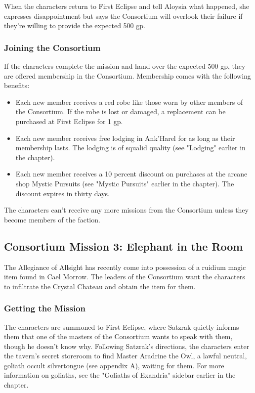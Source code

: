 \documentclass[10pt,a4paper,twoside,twocolumn,openany,nodeprecatedcode]{dndbook}
\begin{document}
When the characters return to First Eclipse and tell Aloysia what happened, she expresses disappointment but says the Consortium will overlook their failure if they're willing to provide the expected 500 gp.

\subsubsection{Joining the Consortium}
If the characters complete the mission and hand over the expected 500 gp, they are offered membership in the Consortium. Membership comes with the following benefits:


\begin{itemize}
\item Each new member receives a red robe like those worn by other members of the Consortium. If the robe is lost or damaged, a replacement can be purchased at First Eclipse for 1 gp.
\item Each new member receives free lodging in Ank'Harel for as long as their membership lasts. The lodging is of squalid quality (see "Lodging" earlier in the chapter).
\item Each new member receives a 10 percent discount on purchases at the arcane shop Mystic Pursuits (see "Mystic Pursuits" earlier in the chapter). The discount expires in thirty days.
\end{itemize}

The characters can't receive any more missions from the Consortium unless they become members of the faction.

\subsection{Consortium Mission 3: Elephant in the Room}
The Allegiance of Allsight has recently come into possession of a ruidium magic item found in Cael Morrow. The leaders of the Consortium want the characters to infiltrate the Crystal Chateau and obtain the item for them.

\subsubsection{Getting the Mission}
The characters are summoned to First Eclipse, where Satzrak quietly informs them that one of the masters of the Consortium wants to speak with them, though he doesn't know why. Following Satzrak's directions, the characters enter the tavern's secret storeroom to find Master Aradrine the Owl, a lawful neutral, goliath occult silvertongue (see appendix A), waiting for them. For more information on goliaths, see the "Goliaths of Exandria" sidebar earlier in the chapter.
\end{document}
